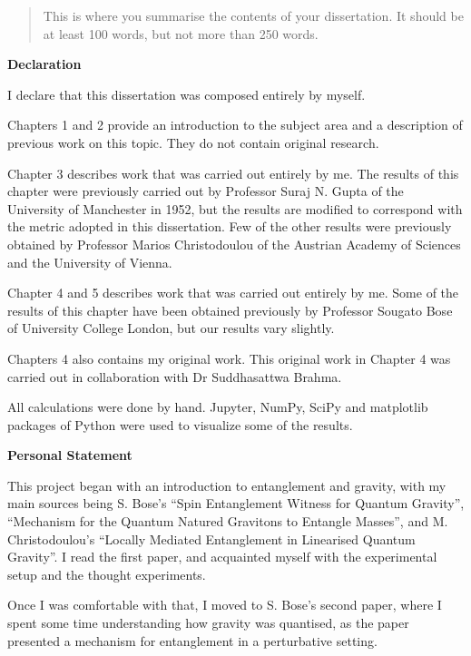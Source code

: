 \documentclass[12pt,a4paper]{report}
\theoremstyle{plain}
\theoremstyle{definition}
\theoremstyle{remark}
\begin{document}
\begin{abstract}
This is where you summarise the contents of your dissertation. It should be
at least 100 words, but not more than 250 words.
\end{abstract}


\begin{center}
\textbf{Declaration}
\end{center}

I declare that this dissertation was composed entirely by myself.

Chapters 1 and 2 provide an introduction to the subject area and a
description of previous work on this topic. They do not contain
original research.

Chapter 3 describes work that was carried out entirely by me. The results of this chapter were previously carried out by Professor Suraj N. Gupta of the University of Manchester in 1952, but the results are modified to correspond with the metric adopted in this dissertation. Few of the other results were previously obtained by Professor Marios Christodoulou of the Austrian Academy of Sciences and the University of Vienna. 

Chapter 4 and 5 describes work that was carried out entirely by me. Some of the results of this chapter have been obtained previously by Professor Sougato Bose of University College London, but our results vary slightly.

Chapters 4 also contains my original work. This original work in
Chapter 4 was carried out in collaboration with Dr Suddhasattwa Brahma.

All calculations were done by hand. Jupyter, NumPy, SciPy and matplotlib packages of Python were used to visualize some of the results.

\newpage

\begin{center}
\textbf{Personal Statement}
\end{center}

This project began with an introduction to entanglement and gravity, with my main sources being S. Bose's ``Spin Entanglement Witness for Quantum Gravity'', ``Mechanism for the Quantum Natured Gravitons to Entangle Masses'', and M. Christodoulou's ``Locally Mediated Entanglement in Linearised Quantum Gravity''. I read the first paper, and acquainted myself with the experimental setup and the thought experiments.

Once I was comfortable with that, I moved to S. Bose's second paper, where I spent some time understanding how gravity was quantised, as the paper presented a mechanism for entanglement in a perturbative setting.
\end{document}
